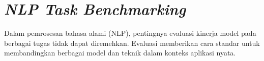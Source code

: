 \section{\textit{NLP Task Benchmarking}}

Dalam pemrosesan bahasa alami (NLP), pentingnya evaluasi kinerja model pada berbagai tugas tidak dapat diremehkan. Evaluasi memberikan cara standar untuk membandingkan berbagai model dan teknik dalam konteks aplikasi nyata.
